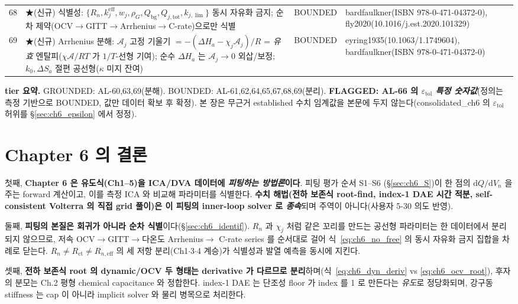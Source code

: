 \documentclass[11pt,a4paper]{article}
\newcommand{\dd}{\mathrm{d}}
\newcommand{\eff}{\mathrm{eff}}
\newcommand{\bg}{\mathrm{bg}}
\newcommand{\tot}{\mathrm{tot}}
\newcommand{\ct}{\mathrm{ct}}
\newcommand{\tol}{\mathrm{tol}}
\newcommand{\brk}{\discretionary{}{}{}}%
\begin{document}
{\begin{longtable}{p{} p{} p{} p{}}
68 & ★(신규) 식별성: $\{R_n,k_j^{\eff},w_j,\rho_G,Q_\bg,Q_{j,\tot},k_{j,\lim}\}$ 동시 자유화 금지; 순차 제약(OCV$\to$GITT$\to$Arrhenius$\to$C-rate)으로만 식별 & BOUNDED & bardfaulkner(ISBN 978-0-\brk 471-04372-0), fly2020(10.1016/\brk j.est.2020.101329) \\
69 & ★(신규) Arrhenius 분해: $\mathcal A_j$ 고정 기울기 $=-(\Delta H_a-\chi_j\mathcal A_j)/R$ = \emph{유효} 엔탈피($\chi\mathcal A/RT$ 가 $1/T$-선형 기여); 순수 $\Delta H_a$ 는 $\mathcal A_j\to0$ 외삽/보정; $k_0,\Delta S_a$ 절편 공선형($\kappa$ 미지 잔여) & BOUNDED & eyring1935(10.1063/\brk 1.1749604), bardfaulkner(ISBN 978-0-\brk 471-04372-0) \\
\bottomrule
\end{longtable}
}
\textbf{tier 요약.} GROUNDED: AL-60,63,69(분해). BOUNDED: AL-61,62,64,65,67,68,69(분리). \textbf{FLAGGED: AL-66 의
$\varepsilon_\tol$ \emph{특정 숫자값}}(정의는 측정 기반으로 BOUNDED, 값만 데이터 확보 후 확정). 본 장은 무근거
established 수치 임계값을 본문에 두지 않는다(consolidated\_ch6 의 $\varepsilon_\tol$ 허위를 \S\ref{sec:ch6_epsilon}
에서 정정).

\section{Chapter 6 의 결론}\label{sec:ch6_concl}
첫째, \textbf{Chapter 6 은 유도식(Ch1--5)을 ICA/DVA 데이터에 \emph{피팅하는 방법론}이다}. 피팅 평가 순서 S1--S6
(\S\ref{sec:ch6_S})이 한 점의 $\dd Q/\dd V_n$ 을 주는 forward 계산이고, 이를 측정 ICA 와 비교해 파라미터를
식별한다. \textbf{수치 해법(전하 보존식 root-find, index-1 DAE 시간 적분, self-consistent Volterra 의 직접 grid
풀이)은 이 피팅의 inner-loop solver 로 \emph{종속}}되며 주역이 아니다(사용자 5-30 의도 반영).

둘째, \textbf{피팅의 본질은 회귀가 아니라 순차 식별}이다(\S\ref{sec:ch6_identif}). $R_n$ 과 $\chi_j$ 처럼 같은
꼬리를 만드는 공선형 파라미터는 한 데이터에서 분리되지 않으므로, 저속 OCV$\to$GITT$\to$다온도 Arrhenius$\to$
C-rate series 를 순서대로 걸어 식~\eqref{eq:ch6_no_free} 의 동시 자유화 금지 집합을 차례로 닫는다. $R_n\ne R_\ct
\ne R_{n,\eff}$ 의 세 저항 분리(Ch1$\cdot$3$\cdot$4 계승)가 식별성과 발열 예측을 동시에 지킨다.

셋째, \textbf{전하 보존식 root 의 dynamic/OCV 두 형태는 derivative 가 다르므로 분리}하며(식~\eqref{eq:ch6_dyn_deriv}
vs \eqref{eq:ch6_ocv_root}), 후자의 분모는 Ch.2 평형 chemical capacitance 와 정합한다. index-1 DAE 는 단조성
floor 가 index 를 1 로 만든다는 \emph{유도}로 정당화되며, 강구동 stiffness 는 cap 이 아니라 implicit solver 와
물리 병목으로 처리한다.
\end{document}
